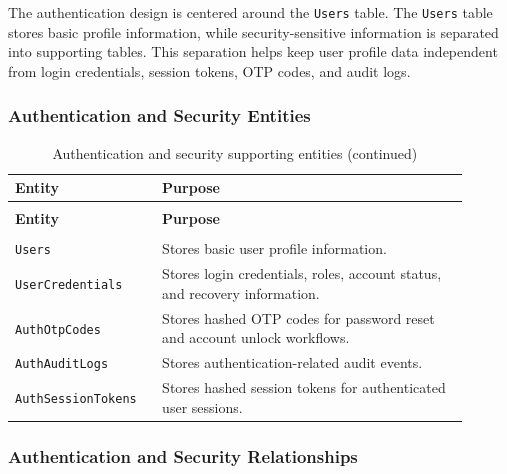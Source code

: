 ﻿\documentclass{article}
\begin{document}
The authentication design is centered around the \texttt{Users} table. The \texttt{Users} table
stores basic profile information, while security-sensitive information is separated into supporting
tables. This separation helps keep user profile data independent from login credentials, session
tokens, OTP codes, and audit logs.

\subsubsection{Authentication and Security Entities}

\begin{longtable}{
    >{\raggedright\arraybackslash}p{0.28\linewidth}
    J{0.62\linewidth}
}
\caption{Authentication and security supporting entities}
\label{tab:auth-security-entities} \\

\toprule
\textbf{Entity} & \textbf{Purpose} \\
\midrule
\endfirsthead

\caption[]{Authentication and security supporting entities (continued)} \\

\toprule
\textbf{Entity} & \textbf{Purpose} \\
\midrule
\endhead

\midrule
{} \\
\endfoot

\bottomrule
\endlastfoot

\texttt{Users}
& Stores basic user profile information. \\

\texttt{UserCredentials}
& Stores login credentials, roles, account status, and recovery information. \\

\texttt{AuthOtpCodes}
& Stores hashed OTP codes for password reset and account unlock workflows. \\

\texttt{AuthAuditLogs}
& Stores authentication-related audit events. \\

\texttt{AuthSessionTokens}
& Stores hashed session tokens for authenticated user sessions. \\

\end{longtable}

\subsubsection{Authentication and Security Relationships}
\end{document}
